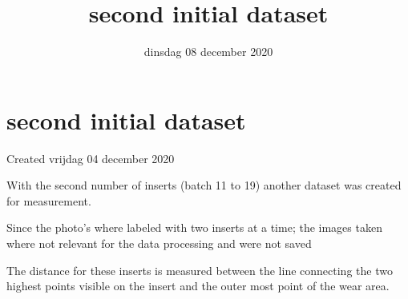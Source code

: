 \documentclass{scrartcl}
\title{second initial dataset}
\date{dinsdag 08 december 2020}
\author{}
\begin{document}
\maketitle

		\section{second initial dataset}

Created vrijdag 04 december 2020



With the second number of inserts (batch 11 to 19) another dataset was created for measurement.

Since the photo's where labeled with two inserts at a time; the images taken where not relevant for the data processing and were not saved



The distance for these inserts is measured between the line connecting the two highest points visible on the insert and the outer most point of the wear area.
\end{document}
